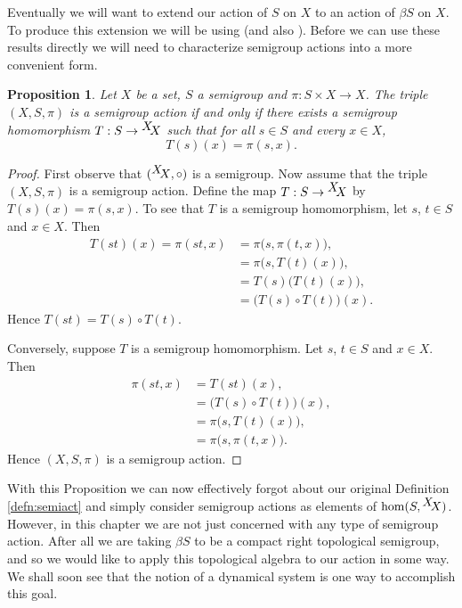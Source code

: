 \documentclass[12pt]{article}
\theoremstyle{plain}
\newtheorem{prop}[thm]{Proposition}
\theoremstyle{definition}
\newcommand{\setfunc}[2]{\hbox{${}^{\hbox{$#1$}}\hskip -3 pt #2$}}
\begin{document}
Eventually we will want to extend our action of $S$ on $X$ to an
action of $\beta S$ on $X$.
To produce this extension we will be using \cite[Lemma
3.30]{Hindman:1998fk} (and also \cite[Corollary
4.22]{Hindman:1998fk}). 
Before we can use these results directly we will need to characterize
semigroup actions into a more convenient form. 

  \begin{prop} 
    \label{prop:semiact}
    Let $X$ be a set, $S$ a semigroup and $\pi : S \times X \to X$.
    The triple $(X, S, \pi)$ is a semigroup action if and only if
    there exists a semigroup homomorphism $T : S \to \setfunc{X}{X}$ such
    that for all $s \in S$ and every $x \in X$,
      \[ T(s)(x) = \pi(s,x). \]
  \end{prop}
  \begin{proof}
    First observe that $(\setfunc{X}{X}, \circ)$ is a semigroup.
    Now assume that the triple $(X, S, \pi)$ is a semigroup action. 
    Define the map $T : S \to \setfunc{X}{X}$ by $T(s)(x) =
    \pi(s,x)$.
    To see that $T$ is a semigroup homomorphism, let $s$, $t \in S$
    and $x \in X$. 
    Then 
      \begin{align*}
        T(st)(x) = \pi(st,x) &= \pi\bigl(s, \pi(t,x)\bigr), \\
        &= \pi\bigl(s, T(t)(x)\bigr), \\
        &= T(s)\bigl(T(t)(x)\bigr), \\
        &= \bigl(T(s) \circ T(t)\bigr) (x).
      \end{align*}
    Hence $T(st) = T(s) \circ T(t)$.

    Conversely, suppose $T$ is a semigroup homomorphism. 
    Let $s$, $t \in S$ and $x \in X$.
    Then 
      \begin{align*}
        \pi(st, x) &= T(st)(x), \\
        &= \bigl(T(s) \circ T(t)\bigr) (x), \\
        &= \pi\bigl(s, T(t)(x)\bigr), \\
        &= \pi\bigl(s, \pi(t,x)\bigr).
      \end{align*}
    Hence $(X, S, \pi)$ is a semigroup action.
  \end{proof}

With this Proposition we can now effectively forgot about our original
Definition \ref{defn:semiact} and simply consider semigroup actions
as elements of $\hom(S, \setfunc{X}{X})$. 
However, in this chapter we are not just concerned with any type of
semigroup action.
After all we are taking $\beta S$ to be a compact right topological
semigroup, and so we would like to apply this topological algebra to
our action in some way. 
We shall soon see that the notion of a dynamical system is one way to
accomplish this goal.
\end{document}
